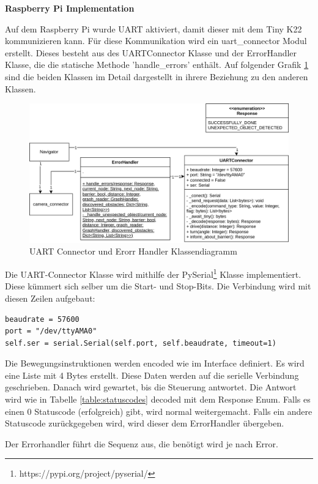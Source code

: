 \textbf{Raspberry Pi Implementation}

Auf dem Raspberry Pi wurde UART aktiviert, damit dieser mit dem Tiny K22 kommunizieren kann.
Für diese Kommunikation wird ein uart\_connector Modul erstellt. Dieses besteht aus des UARTConnector Klasse und der ErrorHandler Klasse, die die statische Methode 'handle\_errors' enthält. Auf folgender Grafik \ref{fig:uart-connector-nav} sind die beiden Klassen im Detail dargestellt in ihrere Beziehung zu den anderen Klassen.

\begin{figure}[H]
\centering
\includegraphics[width=\textwidth]{assets/IT/robot-sw-architecture-uart-connector.png}
\caption{UART Connector und Erorr Handler Klassendiagramm}
\label{fig:uart-connector-nav}
\end{figure}

Die UART-Connector Klasse  wird mithilfe der PySerial\footnote{https://pypi.org/project/pyserial/} Klasse implementiert. Diese kümmert sich selber um die Start- und Stop-Bits.
Die Verbindung wird mit diesen Zeilen aufgebaut:
\begin{verbatim}
beaudrate = 57600
port = "/dev/ttyAMA0"
self.ser = serial.Serial(self.port, self.beaudrate, timeout=1)
\end{verbatim}

Die Bewegungsinstruktionen werden encoded wie im Interface definiert. Es wird eine Liste mit 4 Bytes erstellt.
Diese Daten werden auf die serielle Verbindung geschrieben.
Danach wird gewartet, bis die Steuerung antwortet. Die Antwort wird wie in Tabelle \ref{table:statuscodes} decoded mit dem Response Enum.
Falls es einen 0 Statuscode (erfolgreich) gibt, wird normal weitergemacht. Falls ein andere Statuscode zurückgegeben wird, wird dieser dem ErrorHandler übergeben.

Der Errorhandler führt die Sequenz aus, die benötigt wird je nach Error.

